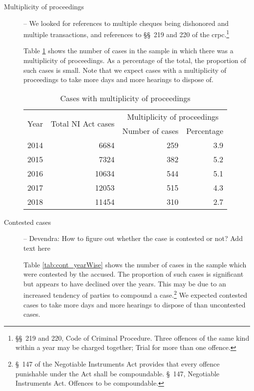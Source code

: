\documentclass[12pt,a4paper]{article}
\begin{document}
\begin{description}
		\item[]
		
		\item [Multiplicity of proceedings] -- We looked for references to multiple cheques being dishonored and multiple transactions, and references to \S\S~219 and 220 of the \gls{crpc}.\footnote{\S\S~219 and 220, Code of Criminal Procedure. Three offences of the same kind within a year may be charged together; Trial for more than one offence.}
		
		Table \ref{tab:mult_yearWise} shows the number of cases in the sample in which there was a multiplicity of proceedings. As a percentage of the total, the proportion of such cases is small. Note that we expect cases with a multiplicity of proceedings to take more days and more hearings to dispose of. %
		
		\begin{table}[!ht]
			\caption{Cases with multiplicity of proceedings} \label{tab:mult_yearWise}
			\centering
			\footnotesize
			\begin{tabular}{lrrr}
				\toprule
				\multirow{2}{*}{Year} & \multirow{2}{*}{Total NI Act cases} & \multicolumn{2}{c}{Multiplicity of proceedings}\\
				\cmidrule{3-4}
				&& Number of cases & Percentage \\
				\midrule %
				2014 & 6684 & 259 & 3.9 \\
				2015 & 7324 & 382 & 5.2 \\
				2016 & 10634 & 544 & 5.1 \\
				2017 & 12053 & 515 & 4.3 \\
				2018 & 11454 & 310 & 2.7 \\
				\bottomrule
			\end{tabular}
		\end{table}
		
		
		\item[]
		
		\item [Contested cases] -- {\color{red} Devendra: How to figure out whether the case is contested or not? Add text here}
		
		Table \ref{tab:cont_yearWise} shows the number of cases in the sample which were contested by the accused. The proportion of such cases is significant but appears to have declined over the years. This may be due to an increased tendency of parties to compound a case.\footnote{\S~147 of the Negotiable Instruments Act provides that every offence punishable under the Act shall be compoundable. \S~147, Negotiable Instruments Act. Offences to be compoundable.} We expected contested cases to take more days and more hearings to dispose of than uncontested cases.
		

\end{description}
\end{document}
